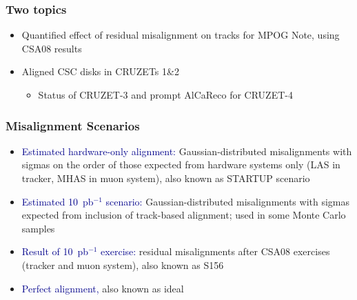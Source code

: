 \documentclass[compress]{beamer}
\begin{document}
\begin{frame}
\frametitle{Two topics}
\begin{itemize}\setlength{\itemsep}{1 cm}
\item Quantified effect of residual misalignment on tracks for MPOG Note, using CSA08 results

\item Aligned CSC disks in CRUZETs 1\&2

\vspace{0.1 cm}
\begin{itemize}
\item Status of CRUZET-3 and prompt AlCaReco for CRUZET-4
\end{itemize}
\end{itemize}
\end{frame}

\begin{frame}
\frametitle{Misalignment Scenarios}
\begin{itemize}\setlength{\itemsep}{0.5 cm}
\item \textcolor{darkblue}{Estimated hardware-only alignment:} Gaussian-distributed
  misalignments with sigmas on the order of those expected from
  hardware systems only (LAS in tracker, MHAS in muon system), also
  known as STARTUP scenario

\item \textcolor{darkblue}{Estimated 10~pb$^{-1}$ scenario:} Gaussian-distributed
  misalignments with sigmas expected from inclusion of track-based
  alignment; used in some Monte Carlo samples

\item \textcolor{darkblue}{Result of 10~pb$^{-1}$ exercise:} residual misalignments after
  CSA08 exercises (tracker and muon system), also known as S156

\item \textcolor{darkblue}{Perfect alignment,} also known as ideal
\end{itemize}
\end{frame}
\end{document}
